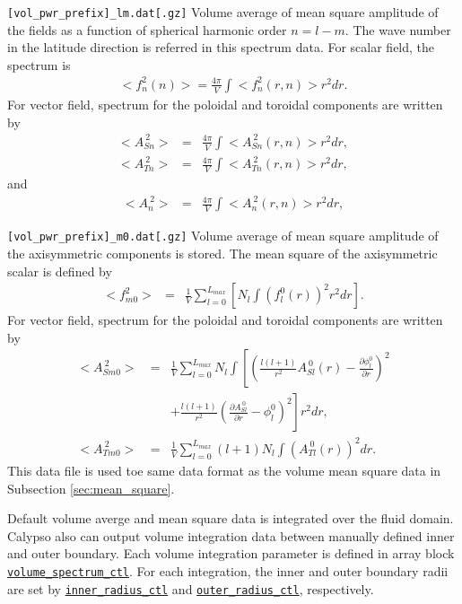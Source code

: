 \begin{description}
\item{\tt [vol\_pwr\_prefix]\_lm.dat[.gz]} Volume average of mean square amplitude of the fields as a function of spherical harmonic order $n = l-m$. The wave number in the latitude direction is referred in this spectrum data. For scalar field, the spectrum is
%
\begin{eqnarray}
<f_{n}^{2}(n)> =   \frac{4\pi}{V} \int <f_{n}^{2}(r,n)> r^{2} dr.
\end{eqnarray}
%
For vector field, spectrum for the poloidal and toroidal components are written by 
%
\begin{eqnarray}
<A_{Sn}^{\ 2} > & = &  \frac{4\pi}{V} \int <A_{Sn}^{\ 2}(r,n) >  r^{2} dr,
\nonumber \\
<A_{Tn}^{\ 2} > & = &  \frac{4\pi}{V} \int <A_{Tn}^{\ 2}(r,n) >  r^{2} dr,
\end{eqnarray}
and
\begin{eqnarray}
<A_{n}^{\ 2} > & = &  \frac{4\pi}{V} \int <A_{n}^{\ 2}(r,n) >  r^{2} dr,
\label{eq:vol_vec_msq_lm}
\end{eqnarray}
%
\item{\tt [vol\_pwr\_prefix]\_m0.dat[.gz]} Volume average of mean square amplitude of the axisymmetric components is stored. The mean square of the axisymmetric scalar is defined by 
%
\begin{eqnarray}
<f_{m0}^{2}> 
&=&  \frac{1}{V} \sum_{l=0}^{L_{max}} \left[ N_{l} \int \left(f_{l}^{0}(r) \right)^2 r^{2} dr \right].
\end{eqnarray}
%
For vector field, spectrum for the poloidal and toroidal components are written by 
\begin{eqnarray}
<A_{Sm0}^{\ 2} >\ &=& \frac{1}{V} \sum_{l=0}^{L_{max}} N_{l}
\int \left[  \left(\frac{l\left(l+1 \right) }{r^{2}} A_{Sl}^{\ 0}(r) - \frac{\partial \phi_{l}^{0}}{\partial r} \right)^{2} 
\right. \nonumber \\
& & \left. +  \frac{l \left( l+1 \right)}{r^{2}} \left( \frac{\partial A_{Sl}^{\ 0}}{\partial r} - \phi_{l}^{0} \right)^{2} \right] r^{2} dr, \\
<A_{Tm0}^{\ 2} > &=& \frac{1}{V}   \sum_{l=0}^{L_{max}} \left( l+1 \right) N_{l}  \int \left( A_{Tl}^{\ 0}(r) \right)^{2} dr.
\end{eqnarray}
%
This data file is used toe same data format as the volume mean square data in Subsection \ref{sec:mean_square}. 
%
\end{description}

Default volume averge and mean square data is integrated over the fluid domain. Calypso also can output volume integration data between manually defined inner and outer boundary. Each volume integration parameter is defined in array block \hyperref[href_t:volume_spectrum_ctl]{\tt volume\_spectrum\_ctl}. For each integration, the inner and outer boundary radii are set by \hyperref[href_t:inner_radius_ctl]{\tt inner\_radius\_ctl} and \hyperref[href_t:outer_radius_ctl]{\tt outer\_radius\_ctl}, respectively.


